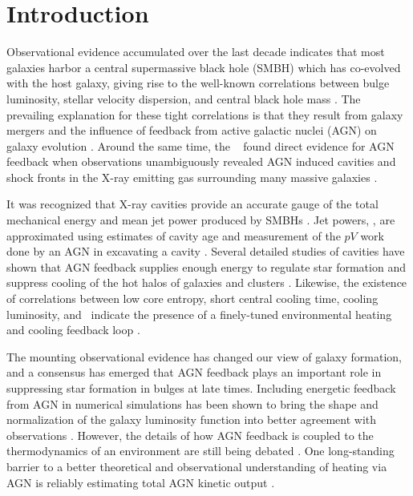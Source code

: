 \documentclass{emulateapj}
\begin{document}


\section{Introduction}
\label{sec:intro}

Observational evidence accumulated over the last decade indicates that
most galaxies harbor a central supermassive black hole (SMBH) which
has co-evolved with the host galaxy, giving rise to the well-known
correlations between bulge luminosity, stellar velocity dispersion,
and central black hole mass \citep{1995ARA&A..33..581K, magorrian,
  2000ApJ...539L...9F, 2000ApJ...539L..13G, marconihunt03,
  2005MNRAS.362...25B}. The prevailing explanation for these tight
correlations is that they result from galaxy mergers and the influence
of feedback from active galactic nuclei (AGN) on galaxy evolution
\citep[\eg][]{1998A&A...331L...1S, 2000MNRAS.311..576K}. Around the
same time, the \cxo\ \citep{chandra} found direct evidence for AGN
feedback when observations unambiguously revealed AGN induced cavities
and shock fronts in the X-ray emitting gas surrounding many massive
galaxies \citep[\eg][]{2000ApJ...534L.135M, perseus1, schindler01}.

It was recognized that X-ray cavities provide an accurate gauge of the
total mechanical energy and mean jet power produced by SMBHs
\citep{2000ApJ...534L.135M}. Jet powers, \pjet, are approximated using
estimates of cavity age and measurement of the $pV$ work done by an
AGN in excavating a cavity \citep[see][for a
  review]{mcnamrev}. Several detailed studies of cavities have shown
that AGN feedback supplies enough energy to regulate star formation
and suppress cooling of the hot halos of galaxies and clusters
\citep{birzan04, 2005MNRAS.364.1343D, rafferty06, dunn08,
  birzan08}. Likewise, the existence of correlations between low core
entropy, short central cooling time, cooling luminosity, and
\pjet\ indicate the presence of a finely-tuned environmental heating
and cooling feedback loop \citep{haradent, 2008ApJ...687..899R,
  accept}.

The mounting observational evidence has changed our view of galaxy
formation, and a consensus has emerged that AGN feedback plays an
important role in suppressing star formation in bulges at late
times. Including energetic feedback from AGN in numerical simulations
has been shown to bring the shape and normalization of the galaxy
luminosity function into better agreement with observations
\citep{croton06, bower06, saro06, sijacki07}. However, the details of
how AGN feedback is coupled to the thermodynamics of an environment
are still being debated \citep{2008ASPC..386..343D,
2009arXiv0910.3691M}. One long-standing barrier to a better
theoretical and observational understanding of heating via AGN is
reliably estimating total AGN kinetic output
\citep[\eg][]{1991Natur.349..138R, 1996AJ....112....9L}.
\end{document}
